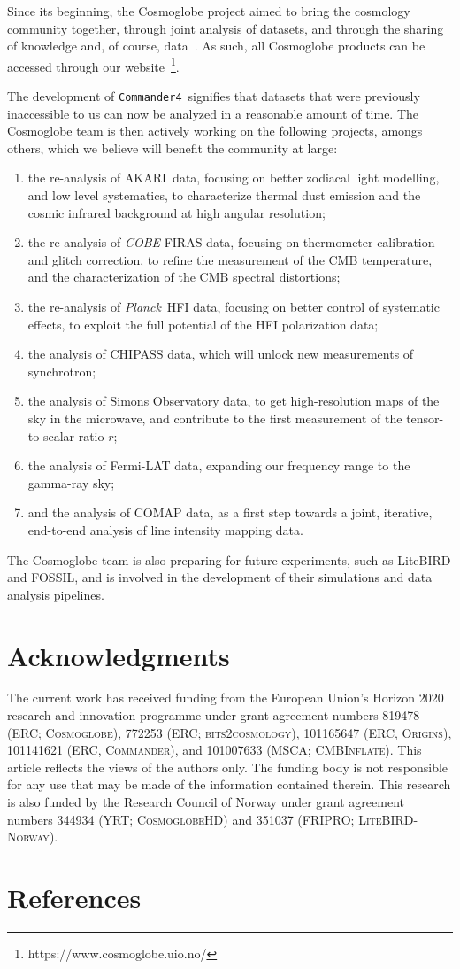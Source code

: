 \documentclass{moriond}
\def\commanderfour{\texttt{Commander4}}
\def\Planck{\textit{Planck}}
\def\COBE{\textit{COBE}}
\def\AKARI{\textrm{{AKARI}}}
\begin{document}
Since its beginning, the Cosmoglobe project aimed to bring the cosmology community together, through joint analysis of datasets, and through the sharing of knowledge and, of course, data~\cite{bp05}. As such, all Cosmoglobe products can be accessed through our website~\footnote{https://www.cosmoglobe.uio.no/}.

The development of \commanderfour\ signifies that datasets that were previously inaccessible to us can now be analyzed in a reasonable amount of time. The Cosmoglobe team is then actively working on the following projects, amongs others, which we believe will benefit the community at large:
\begin{enumerate}
\item the re-analysis of \AKARI\ data, focusing on better zodiacal light modelling, and low level systematics, to characterize thermal dust emission and the cosmic infrared background at high angular resolution;
\item the re-analysis of \COBE-FIRAS data, focusing on thermometer calibration and glitch correction, to refine the measurement of the CMB temperature, and the characterization of the CMB spectral distortions;
\item the re-analysis of \Planck\ HFI data, focusing on better control of systematic effects, to exploit the full potential of the HFI polarization data;
\item the analysis of CHIPASS data, which will unlock new measurements of synchrotron;
\item the analysis of Simons Observatory data, to get high-resolution maps of the sky in the microwave, and contribute to the first measurement of the tensor-to-scalar ratio $r$;
\item the analysis of Fermi-LAT data, expanding our frequency range to the gamma-ray sky;
\item and the analysis of COMAP data, as a first step towards a joint, iterative, end-to-end analysis of line intensity mapping data.
\end{enumerate}

The Cosmoglobe team is also preparing for future experiments, such as LiteBIRD and FOSSIL, and is involved in the development of their simulations and data analysis pipelines.

\section*{Acknowledgments}
The current work has received funding from the European Union’s Horizon
  2020 research and innovation programme under grant agreement numbers
  819478 (ERC; \textsc{Cosmoglobe}), 772253 (ERC;
  \textsc{bits2cosmology}), 101165647 (ERC, \textsc{Origins}),
  101141621 (ERC, \textsc{Commander}), and 101007633 (MSCA;
  \textsc{CMBInflate}).  This article reflects the views of the
  authors only. The funding body is not responsible for any use that
  may be made of the information contained therein. This research is
  also funded by the Research Council of Norway under grant agreement
  numbers 344934 (YRT; \textsc{CosmoglobeHD}) and 351037 (FRIPRO;
  \textsc{LiteBIRD-Norway}).

\section*{References}

\end{document}
